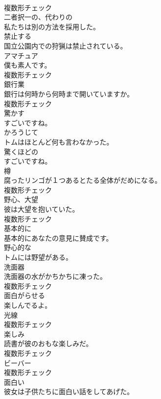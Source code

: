 \documentclass[8pt]{extreport}
\begin{document}
\begin{CJK}{UTF8}{min}
\\	複数形チェック
\\	[形容詞]	二者択一の、代わりの	
\\	私たちは別の方法を採用した。	
\\	[動詞]	禁止する	
\\	国立公園内での狩猟は禁止されている。	
\\	[名詞]	アマチュア	
\\	僕も素人です。	
\\	複数形チェック
\\	[名詞]	銀行業	
\\	銀行は何時から何時まで開いていますか。	
\\	複数形チェック
\\	[動詞]	驚かす	
\\	すごいですね。	
\\	[副詞]	かろうじて	
\\	トムはほとんど何も言わなかった。	
\\	[形容詞]	驚くほどの	
\\	すごいですね。	
\\	[名詞]	樽	
\\	腐ったリンゴが１つあるとたる全体がだめになる。	
\\	複数形チェック
\\	[名詞]	野心、大望	
\\	彼は大望を抱いていた。	
\\	複数形チェック
\\	[副詞]	基本的に	
\\	基本的にあなたの意見に賛成です。	
\\	[形容詞]	野心的な	
\\	トムには野望がある。	
\\	[名詞]	洗面器	
\\	洗面器の水がかちかちに凍った。	
\\	複数形チェック
\\	[動詞]	面白がらせる	
\\	楽しんでるよ。	
\\	[名詞]	光線	
\\	複数形チェック
\\	[名詞]	楽しみ	
\\	読書が彼のおもな楽しみだ。	
\\	複数形チェック
\\	[名詞]	ビーバー	
\\	複数形チェック
\\	[形容詞]	面白い	
\\	彼女は子供たちに面白い話をしてあげた。	

\end{CJK}
\end{document}
